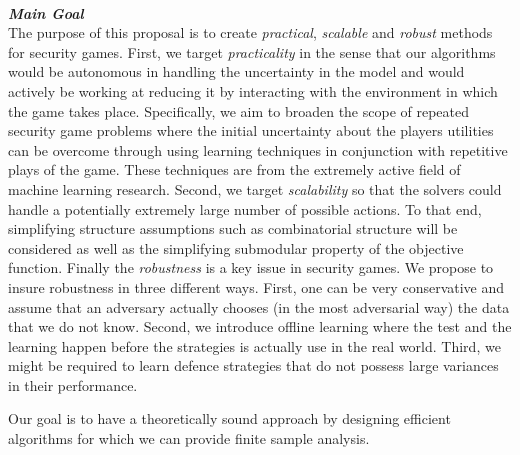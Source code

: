 

\noindent \textit{\textbf{\\Main Goal}}\\
The purpose of this proposal is to create \textit{practical}, \textit{scalable} and \textit{robust} methods for security games. First, we target \textit{practicality}  in the sense that our algorithms would be autonomous in handling the uncertainty in the model and would actively be working at reducing it by interacting with the environment in which the game takes place. Specifically, we aim to broaden the scope of repeated security game problems where the initial uncertainty about the players utilities can be overcome through using learning techniques  in conjunction with  repetitive plays of the game. 
These techniques are from the extremely active field of machine learning research. Second, we target \textit{scalability} so that the solvers could handle a potentially  extremely large number of possible actions. To that end, simplifying structure assumptions such as combinatorial structure will be considered as well as the simplifying submodular property of the objective function.
Finally the \textit{robustness}  is a key issue in security games. We propose to insure robustness in  three different ways. First, one can be  very conservative and assume that an adversary actually chooses (in the most adversarial way) the data that we do not know. Second, we introduce offline learning  where the test and the learning happen  before the strategies is actually use in the real world. Third, we might be required to learn defence strategies that do not possess large variances in their performance.

Our goal is to have a theoretically sound approach by designing efficient algorithms for which we can provide finite sample analysis.%

